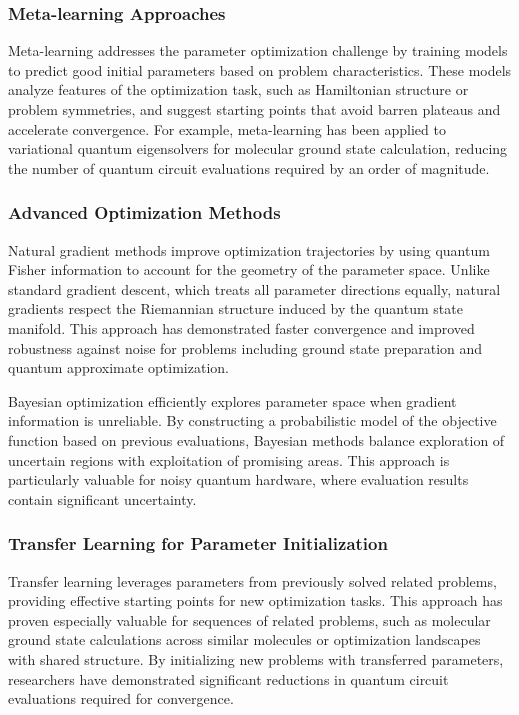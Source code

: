\subsubsection{Meta-learning Approaches}

Meta-learning addresses the parameter optimization challenge by training models to predict good initial parameters based on problem characteristics. These models analyze features of the optimization task, such as Hamiltonian structure or problem symmetries, and suggest starting points that avoid barren plateaus and accelerate convergence. For example, meta-learning has been applied to variational quantum eigensolvers for molecular ground state calculation, reducing the number of quantum circuit evaluations required by an order of magnitude.

\subsubsection{Advanced Optimization Methods}

Natural gradient methods improve optimization trajectories by using quantum Fisher information to account for the geometry of the parameter space. Unlike standard gradient descent, which treats all parameter directions equally, natural gradients respect the Riemannian structure induced by the quantum state manifold. This approach has demonstrated faster convergence and improved robustness against noise for problems including ground state preparation and quantum approximate optimization.

Bayesian optimization efficiently explores parameter space when gradient information is unreliable. By constructing a probabilistic model of the objective function based on previous evaluations, Bayesian methods balance exploration of uncertain regions with exploitation of promising areas. This approach is particularly valuable for noisy quantum hardware, where evaluation results contain significant uncertainty.

\subsubsection{Transfer Learning for Parameter Initialization}

Transfer learning leverages parameters from previously solved related problems, providing effective starting points for new optimization tasks. This approach has proven especially valuable for sequences of related problems, such as molecular ground state calculations across similar molecules or optimization landscapes with shared structure. By initializing new problems with transferred parameters, researchers have demonstrated significant reductions in quantum circuit evaluations required for convergence.

